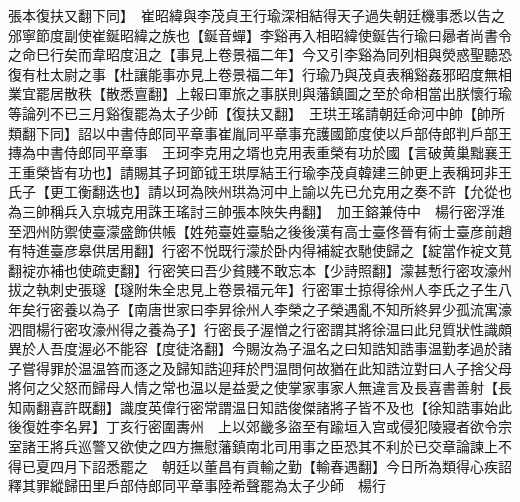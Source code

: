 張本復扶又翻下同】　崔昭緯與李茂貞王行瑜深相結得天子過失朝廷機事悉以告之邠寧節度副使崔鋋昭緯之族也【鋋音蟬】李谿再入相昭緯使鋋告行瑜曰曏者尚書令之命巳行矣而韋昭度沮之【事見上卷景福二年】今又引李谿為同列相與熒惑聖聽恐復有杜太尉之事【杜讓能事亦見上卷景福二年】行瑜乃與茂貞表稱谿姦邪昭度無相業宜罷居散秩【散悉亶翻】上報曰軍旅之事朕則與藩鎮圖之至於命相當出朕懷行瑜等論列不已三月谿復罷為太子少師【復扶又翻】　王珙王瑤請朝廷命河中帥【帥所類翻下同】詔以中書侍郎同平章事崔胤同平章事充護國節度使以戶部侍郎判戶部王摶為中書侍郎同平章事　王珂李克用之壻也克用表重榮有功於國【言破黄巢黜襄王王重榮皆有功也】請賜其子珂節钺王珙厚結王行瑜李茂貞韓建三帥更上表稱珂非王氏子【更工衡翻迭也】請以珂為陜州珙為河中上諭以先已允克用之奏不許【允從也為三帥稱兵入京城克用誅王瑤討三帥張本陜失冉翻】　加王鎔兼侍中　楊行密浮淮至泗州防禦使臺濛盛飾供帳【姓苑臺姓臺駘之後後漢有高士臺佟晉有術士臺彦前趙有特進臺彦皋供居用翻】行密不悦既行濛於卧内得補綻衣馳使歸之【綻當作䘺文莧翻䘺亦補也使疏吏翻】行密笑曰吾少貧賤不敢忘本【少詩照翻】濛甚慙行密攻濠州拔之執刺史張璲【璲附朱全忠見上卷景福元年】行密軍士掠得徐州人李氏之子生八年矣行密養以為子【南唐世家曰李昇徐州人李榮之子榮遇亂不知所終昇少孤流寓濠泗間楊行密攻濠州得之養為子】行密長子渥憎之行密謂其將徐温曰此兒質狀性識頗異於人吾度渥必不能容【度徒洛翻】今賜汝為子温名之曰知誥知誥事温勤孝過於諸子嘗得罪於温温笞而逐之及歸知誥迎拜於門温問何故猶在此知誥泣對曰人子捨父母將何之父怒而歸母人情之常也温以是益愛之使掌家事家人無違言及長喜書善射【長知兩翻喜許既翻】識度英偉行密常謂温日知誥俊傑諸將子皆不及也【徐知誥事始此後復姓李名昇】丁亥行密圍夀州　上以郊畿多盜至有踰垣入宫或侵犯陵寢者欲令宗室諸王將兵巡警又欲使之四方撫慰藩鎮南北司用事之臣恐其不利於已交章論諫上不得已夏四月下詔悉罷之　朝廷以董昌有貢輸之勤【輸春遇翻】今日所為類得心疾詔釋其罪縱歸田里戶部侍郎同平章事陸希聲罷為太子少師　楊行

